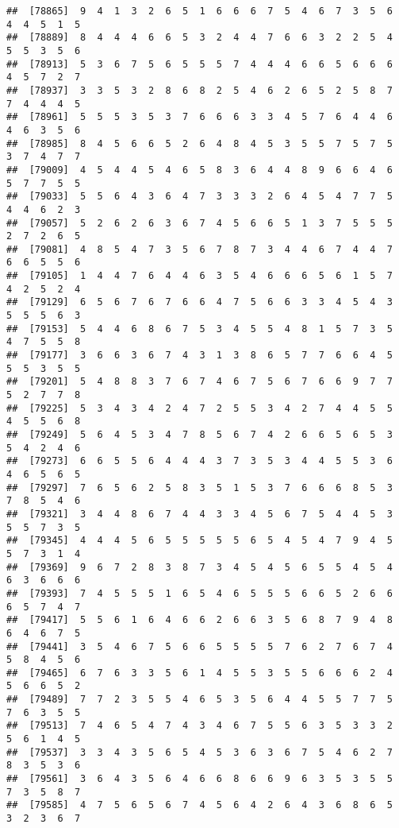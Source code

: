 \documentclass[
]{book}
\begin{document}
\begin{verbatim}
##  [78865]  9  4  1  3  2  6  5  1  6  6  6  7  5  4  6  7  3  5  6  4  4  5  1  5
##  [78889]  8  4  4  4  6  6  5  3  2  4  4  7  6  6  3  2  2  5  4  5  5  3  5  6
##  [78913]  5  3  6  7  5  6  5  5  5  7  4  4  4  6  6  5  6  6  6  4  5  7  2  7
##  [78937]  3  3  5  3  2  8  6  8  2  5  4  6  2  6  5  2  5  8  7  7  4  4  4  5
##  [78961]  5  5  5  3  5  3  7  6  6  6  3  3  4  5  7  6  4  4  6  4  6  3  5  6
##  [78985]  8  4  5  6  6  5  2  6  4  8  4  5  3  5  5  7  5  7  5  3  7  4  7  7
##  [79009]  4  5  4  4  5  4  6  5  8  3  6  4  4  8  9  6  6  4  6  5  7  7  5  5
##  [79033]  5  5  6  4  3  6  4  7  3  3  3  2  6  4  5  4  7  7  5  4  4  6  2  3
##  [79057]  5  2  6  2  6  3  6  7  4  5  6  6  5  1  3  7  5  5  5  2  7  2  6  5
##  [79081]  4  8  5  4  7  3  5  6  7  8  7  3  4  4  6  7  4  4  7  6  6  5  5  6
##  [79105]  1  4  4  7  6  4  4  6  3  5  4  6  6  6  5  6  1  5  7  4  2  5  2  4
##  [79129]  6  5  6  7  6  7  6  6  4  7  5  6  6  3  3  4  5  4  3  5  5  5  6  3
##  [79153]  5  4  4  6  8  6  7  5  3  4  5  5  4  8  1  5  7  3  5  4  7  5  5  8
##  [79177]  3  6  6  3  6  7  4  3  1  3  8  6  5  7  7  6  6  4  5  5  5  3  5  5
##  [79201]  5  4  8  8  3  7  6  7  4  6  7  5  6  7  6  6  9  7  7  5  2  7  7  8
##  [79225]  5  3  4  3  4  2  4  7  2  5  5  3  4  2  7  4  4  5  5  4  5  5  6  8
##  [79249]  5  6  4  5  3  4  7  8  5  6  7  4  2  6  6  5  6  5  3  5  4  2  4  6
##  [79273]  6  6  5  5  6  4  4  4  3  7  3  5  3  4  4  5  5  3  6  4  6  5  6  5
##  [79297]  7  6  5  6  2  5  8  3  5  1  5  3  7  6  6  6  8  5  3  7  8  5  4  6
##  [79321]  3  4  4  8  6  7  4  4  3  3  4  5  6  7  5  4  4  5  3  5  5  7  3  5
##  [79345]  4  4  4  5  6  5  5  5  5  5  6  5  4  5  4  7  9  4  5  5  7  3  1  4
##  [79369]  9  6  7  2  8  3  8  7  3  4  5  4  5  6  5  5  4  5  4  6  3  6  6  6
##  [79393]  7  4  5  5  5  1  6  5  4  6  5  5  5  6  6  5  2  6  6  6  5  7  4  7
##  [79417]  5  5  6  1  6  4  6  6  2  6  6  3  5  6  8  7  9  4  8  6  4  6  7  5
##  [79441]  3  5  4  6  7  5  6  6  5  5  5  5  7  6  2  7  6  7  4  5  8  4  5  6
##  [79465]  6  7  6  3  3  5  6  1  4  5  5  3  5  5  6  6  6  2  4  5  6  6  5  2
##  [79489]  7  7  2  3  5  5  4  6  5  3  5  6  4  4  5  5  7  7  5  7  6  3  5  5
##  [79513]  7  4  6  5  4  7  4  3  4  6  7  5  5  6  3  5  3  3  2  5  6  1  4  5
##  [79537]  3  3  4  3  5  6  5  4  5  3  6  3  6  7  5  4  6  2  7  8  3  5  3  6
##  [79561]  3  6  4  3  5  6  4  6  6  8  6  6  9  6  3  5  3  5  5  7  3  5  8  7
##  [79585]  4  7  5  6  5  6  7  4  5  6  4  2  6  4  3  6  8  6  5  3  2  3  6  7

\end{verbatim}
\end{document}
